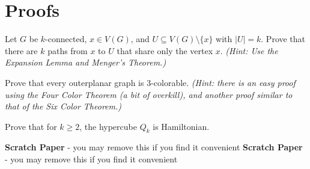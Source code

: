 \documentclass[addpoints,10pt]{exam}
\newcommand{\cp}{\mathbin\Box}
\newcounter{savedqn}
\begin{document}
\section*{Proofs}
\begin{questions}
\setcounter{question}{\thesavedqn}



\question[20] Let $G$ be $k$-connected, $x\in V(G)$, and $U\subseteq V(G)\setminus\{x\}$ with $|U|=k$.  Prove that there are $k$ paths from $x$ to $U$ that share only the vertex $x$.  \textit{(Hint: Use the Expansion Lemma and Menger's Theorem.)}

\pagebreak

\question[20] Prove that every outerplanar graph is 3-colorable.  \textit{(Hint: there is an easy proof using the Four Color Theorem (a bit of overkill), and another proof similar to that of the Six Color Theorem.)}


\pagebreak
\question[20] Prove that for $k\geq2$, the hypercube $Q_k$ is Hamiltonian.




\end{questions}




\newpage
\textbf{Scratch Paper} - you may remove this if you find it convenient
\newpage
\textbf{Scratch Paper} - you may remove this if you find it convenient
\end{document}
